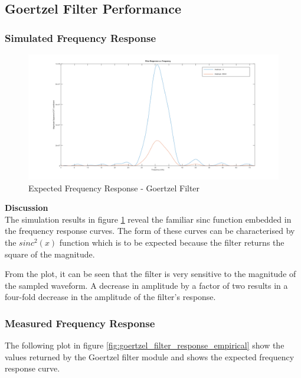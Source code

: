\subsection{Goertzel Filter Performance}

\subsubsection{Simulated Frequency Response}

\begin{figure}[H]
	\centering
	\includegraphics[width=\linewidth]{figures/results/goertzel_filter_simulation_wide.png}
	\caption{Expected Frequency Response - Goertzel Filter}
	\label{fig:goertzel_filter_response_simulated}
\end{figure}



\textbf{Discussion}\\
The simulation results in figure \ref{fig:goertzel_filter_response_simulated} reveal the familiar sinc function embedded in the frequency response curves. The form of these curves can be characterised by the $sinc^2(x)$ function which is to be expected because the filter returns the square of the magnitude.

From the plot, it can be seen that the filter is very sensitive to the magnitude of the sampled waveform. A decrease in amplitude by a factor of two results in a four-fold decrease in the amplitude of the filter's response.




\subsubsection{Measured Frequency Response}

The following plot in figure \ref{fig:goertzel_filter_response_empirical} show the values returned by the Goertzel filter module and shows the expected frequency response curve.

